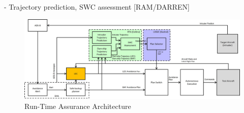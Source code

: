 - Trajectory prediction, SWC assessment [RAM/DARREN]


\begin{figure}
	\centering
	\includegraphics[width=\textwidth]{figures/rta-arch.jpg}
	\caption{Run-Time Assurance Architecture}
	\label{fig:rta-arch}
\end{figure}

